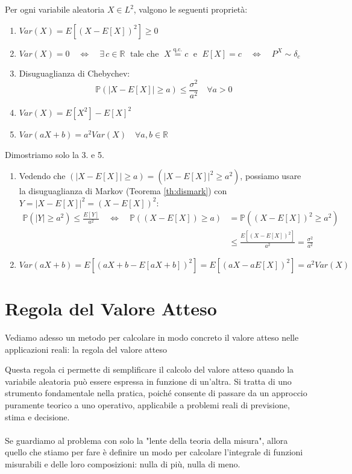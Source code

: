 \begin{teorema}
    Per ogni variabile aleatoria $X\in L^2$, valgono le seguenti proprietà:
    \begin{enumerate}
        \item $Var(X) = E\left[(X-E[X])^2\right] \geq 0$
        \item $Var(X) = 0\quad \iff \quad \exists \,c\in \mathbb{R}\;\text{ tale che }\; X \overset{\text{q.c.}}{=} c \; \text{ e } \;E[X] = c \quad \iff\quad P^X\sim \delta_c$
        \item Disuguaglianza di Chebychev:\\
        \[\boxed{\mathbb{P}(|X-E[X]|\geq a)\leq \frac{\sigma^2}{a^2}}\quad \forall a>0\]
        \item $Var(X) = E[X^2] - E[X]^2$
        \item $Var(aX+b) = a^2Var(X)\quad \forall a, b\in\mathbb{R}$
    \end{enumerate}
    \begin{dimostrazione}
    Dimostriamo solo la 3. e 5.
    \begin{enumerate} 
        \item [3.] Vedendo che $(|X-E[X]|\geq a) = (|X-E[X]|^2\geq a^2)$, possiamo usare la disuguaglianza di Markov (Teorema \ref{th:dismark}) con $Y = |X-E[X]|^2 = (X-E[X])^2$:
        \begin{align*}\mathbb{P}(|Y|\geq a^2)\leq \frac{E[Y]}{a^2}\quad \iff\quad\mathbb{P}\left((X-E[X])\geq a\right) & = \mathbb{P}\left((X-E[X])^2\geq a^2\right)\\
        &\leq \frac{E\left[(X-E[X])^2\right]}{a^2} = \frac{\sigma^2}{a^2}\end{align*}
        \item [5.] $Var(aX+b) = E\left[(aX+b - E[aX+b])^2\right] = E\left[\left(aX-aE[X]\right)^2\right] = a^2Var(X)$ 
    \end{enumerate}
    \end{dimostrazione}
\end{teorema}

\section{Regola del Valore Atteso}

Vediamo adesso un metodo per calcolare in modo concreto il valore atteso nelle applicazioni reali: la regola del valore atteso

\medskip
\noindent Questa regola ci permette di semplificare il calcolo del valore atteso quando la variabile aleatoria può essere espressa in funzione di un’altra. Si tratta di uno strumento fondamentale nella pratica, poiché consente di passare da un approccio puramente teorico a uno operativo, applicabile a problemi reali di previsione, stima e decisione.\\
\\
Se guardiamo al problema con solo la "lente della teoria della misura", allora quello
che stiamo per fare è definire un modo per calcolare l'integrale di funzioni misurabili e delle loro composizioni: nulla di più, nulla di meno.

